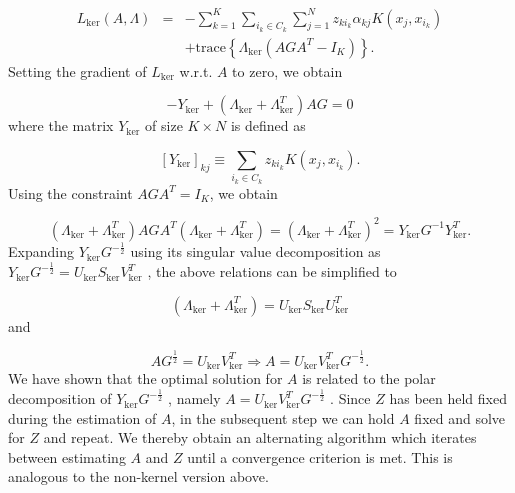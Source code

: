 \begin{eqnarray}
L_{\mathrm{ker}}(A,\Lambda) & = & -\sum_{k=1}^{K}\sum_{i_{k}\in C_{k}}\sum_{j=1}^{N}z_{ki_{k}}\alpha_{kj}K(x_{j},x_{i_{k}})\nonumber \\
 &  & +\mbox{trace}\left\{ \Lambda_{\mathrm{ker}}\left(AGA^{T}-I_{K}\right)\right\} .\label{eq:Lagrangian_ker}
\end{eqnarray}
Setting the gradient of $L_{\mathrm{ker}}$ w.r.t. $A$ to zero, we
obtain

\begin{equation}
-Y_{\mathrm{ker}}+(\Lambda_{\mathrm{ker}}+\Lambda_{\mathrm{ker}}^{T})AG=0\label{eq:Lagrangian_ker_grad}
\end{equation}
where the matrix $Y_{\mathrm{ker}}$ of size $K\times N$ is defined
as 

\begin{equation}
\left[Y_{\mathrm{ker}}\right]_{kj}\equiv\sum_{i_{k}\in C_{k}}z_{ki_{k}}K(x_{j},x_{i_{k}}).\label{eq:Ykerdef}
\end{equation}
Using the constraint $AGA^{T}=I_{K}$, we obtain 

\begin{equation}
(\Lambda_{\mathrm{ker}}+\Lambda_{\mathrm{ker}}^{T})AGA^{T}(\Lambda_{\mathrm{ker}}+\Lambda_{\mathrm{ker}}^{T})=(\Lambda_{\mathrm{ker}}+\Lambda_{\mathrm{ker}}^{T})^{2}=Y_{\mathrm{ker}}G^{-1}Y_{\mathrm{ker}}^{T}.\label{eq:lambdakersol}
\end{equation}
Expanding $Y_{\mathrm{ker}}G^{-\frac{1}{2}}$ using its singular value
decomposition as $Y_{\mathrm{ker}}G^{-\frac{1}{2}}=U_{\mathrm{ker}}S_{\mathrm{ker}}V_{\mathrm{ker}}^{T}$
, the above relations can be simplified to 

\begin{equation}
(\Lambda_{\mathrm{ker}}+\Lambda_{\mathrm{ker}}^{T})=U_{\mathrm{ker}}S_{\mathrm{ker}}U_{\mathrm{ker}}^{T}\label{eq:lambdakerfinal}
\end{equation}
and 

\begin{equation}
AG^{\frac{1}{2}}=U_{\mathrm{ker}}V_{\mathrm{ker}}^{T}\Rightarrow A=U_{\mathrm{ker}}V_{\mathrm{ker}}^{T}G^{-\frac{1}{2}}.\label{eq:Asolfinal}
\end{equation}
We have shown that the optimal solution for $A$ is related to the
polar decomposition of $Y_{\mathrm{ker}}G^{-\frac{1}{2}}$ , namely
$A=U_{\mathrm{ker}}V_{\mathrm{ker}}^{T}G^{-\frac{1}{2}}$ . Since
$Z$ has been held fixed during the estimation of $A$, in the subsequent
step we can hold $A$ fixed and solve for $Z$ and repeat. We thereby
obtain an alternating algorithm which iterates between estimating
$A$ and $Z$ until a convergence criterion is met. This is analogous
to the non-kernel version above.

